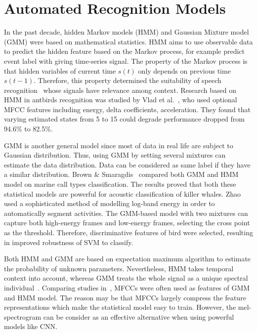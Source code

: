 \section{Automated Recognition Models}
In the past decade, hidden Markov models (HMM) and Gaussian Mixture model (GMM) were based on mathematical statistics. HMM aims to use observable data to predict the hidden feature based on the Markov process, for example predict event label with giving time-series signal. The property of the Markov process is that hidden variables of current time $s(t)$ only depends on previous time $s(t-1)$. Therefore, this property determined the suitability of speech recognition~\cite{rabiner1989tutorial} whose signals have relevance among context. Research based on HMM in antbirds recognition was studied by Vlad et al.~\cite{trifa2008automated}, who used optional MFCC features including energy, delta coefficients, acceleration. They found that varying estimated states from 5 to 15 could degrade performance dropped from 94.6\% to 82.5\%.\par
GMM is another general model since most of data in real life are subject to Gaussian distribution. Thus, using GMM by setting several mixtures can estimate the data distribution. Data can be considered as same label if they have a similar distribution. Brown \& Smaragdis~\cite{brown2009hidden} compared both GMM and HMM model on marine call types classification. The results proved that both these statistical models are powerful for acoustic classification of killer whales.
Zhao~\cite{zhao2017automated} used a sophisticated method of modelling log-band energy in order to automatically segment activities. The GMM-based model with two mixtures can capture both high-energy frames and low-energy frames, selecting the cross point as the threshold. Therefore, discriminative features of bird were selected, resulting in improved robustness of SVM to classify.

Both HMM and GMM are based on expectation maximum algorithm to estimate the probability of unknown parameters. Nevertheless, HMM takes temporal context into account, whereas GMM treats the whole signal as a unique spectral individual~\cite{brown2009hidden}. Comparing studies in~\cite{clemins2003application,trifa2008automated,zhao2017automated}, MFCCs were often used as features of GMM and HMM model. The reason may be that MFCCs largely compress the feature representations which make the statistical model easy to train. However, the mel-spectrogram can be consider as an effective alternative when using powerful models like CNN.

